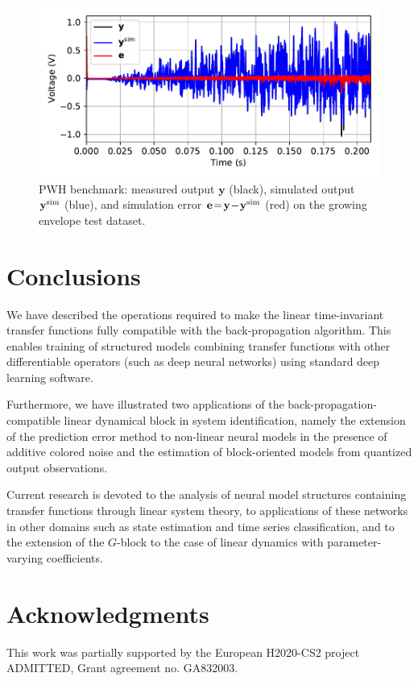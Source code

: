 \documentclass{article}
\newcommand{\tvec}[1]{\mathbf{#1}}
\newcommand{\simul}{{\rm sim}}
\begin{document}
\begin{figure}
 \centering
 \includegraphics[width=.8\textwidth]{fig/PWH_timetrace.pdf} \vspace{-0.5cm}
 \caption{PWH benchmark: measured output $\tvec{y}$ (black),  simulated output $\tvec{y}^{\simul}$ (blue), and simulation error $\tvec{e}\! =\! \tvec{y}\! -\! \tvec{y}^{\simul}$ (red) on the growing envelope test dataset.}
 \label{fig:PWH_timetrace}
\end{figure}


\section{Conclusions}
We have described  the operations required to make the linear time-invariant transfer functions fully compatible with the back-propagation algorithm.
This enables training of structured models combining transfer functions with other differentiable operators (such as deep neural networks) using standard deep learning software. 

Furthermore, we have illustrated two  applications of the back-propagation-compatible linear dynamical block in system identification, namely the extension of the prediction error method to non-linear neural models in the presence of additive colored noise and the estimation of block-oriented models from quantized output observations.

Current  research is devoted to the analysis of neural model structures containing transfer functions through  linear system theory, to applications of these networks in other domains such as state estimation and time series classification, and to the extension of the $G$-block to the case of linear dynamics with parameter-varying coefficients.

\section*{Acknowledgments}
This work was partially supported by the European H2020-CS2 project ADMITTED, Grant agreement no. GA832003.



\end{document}
